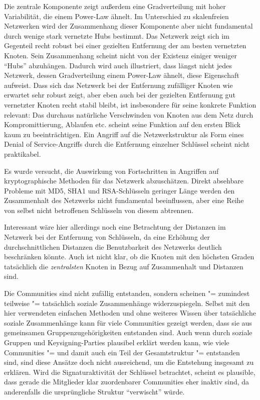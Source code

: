 Die zentrale Komponente zeigt au{\ss}erdem eine Gradverteilung mit
hoher Variabilit\"at, die einem Power-Law \"ahnelt. Im Unterschied zu
skalenfreien Netzwerken wird der Zusammenhang dieser Komponente aber
nicht fundamental durch wenige stark vernetzte Hubs bestimmt. Das
Netzwerk zeigt sich im Gegenteil recht robust bei einer gezielten
Entfernung der am besten vernetzten Knoten. Sein Zusammenhang scheint
nicht von der Existenz einiger weniger "`Hubs"' abzuh\"angen. Dadurch
wird auch illustriert, dass l\"angst nicht jedes Netzwerk, dessen
Gradverteilung einem Power-Law \"ahnelt, diese Eigenschaft aufweist. Dass sich das Netzwerk bei
der Entfernung zuf\"alliger Knoten wie erwartet sehr robust zeigt,
aber eben auch bei der gezielten Entfernung gut vernetzter Knoten
recht stabil bleibt, ist insbesondere f\"ur seine konkrete Funktion
relevant: Das durchaus nat\"urliche Verschwinden von Knoten aus dem
Netz durch Kompromittierung, Ablaufen etc. scheint seine Funktion auf
den ersten Blick kaum zu beeintr\"achtigen. Ein Angriff auf die
Netzwerkstruktur als Form eines Denial of Service-Angriffs durch die
Entfernung einzelner Schl\"ussel scheint nicht praktikabel.

Es wurde versucht, die Auswirkung von Fortschritten in Angriffen auf
kryptographische Methoden für das Netzwerk abzuschätzen. Direkt
absehbare Probleme mit MD5, SHA1 und RSA-Schlüsseln geringer Länge
werden den Zusammenhalt des Netzwerks nicht fundamental beeinflussen,
aber eine Reihe von selbst nicht betroffenen Schlüsseln von diesem
abtrennen.

Interessant w\"are hier allerdings noch eine Betrachtung der Distanzen
im Netzwerk bei der Entfernung von Schl\"usseln, da eine Erh\"ohung
der durchschnittlichen Distanzen die Benutzbarkeit des Netzwerks
deutlich beschr\"anken k\"onnte. Auch ist nicht klar, ob die Knoten
mit den h\"ochsten Graden tats\"achlich die \emph{zentralsten} Knoten
in Bezug auf Zusammenhalt und Distanzen sind.

Die Communities sind nicht zufällig entstanden, sondern scheinen
"= zumindest teilweise "= tatsächlich soziale Zusammenhänge
widerzuspiegeln. Selbst mit den hier verwendeten einfachen Methoden
und ohne weiteres Wissen über tatsächliche soziale Zusammenhänge
kann für viele Communities gezeigt werden, dass sie aus gemeinsamen
Gruppenzugehörigkeiten entstanden sind. Auch wenn durch soziale
Gruppen und Keysigning-Parties plausibel erkl\"art werden kann, wie
viele Communities "= und damit auch ein Teil der Gesamtstruktur "=
entstanden sind, sind diese Ans\"atze doch nicht ausreichend, um die
Entstehung insgesamt zu erkl\"aren. Wird die Signaturaktivit\"at der
Schl\"ussel betrachtet, scheint es plausible, dass gerade die
Mitglieder klar zuordenbarer Communities eher inaktiv sind, da
anderenfalls die urspr\"ungliche Struktur "`verwischt"' w\"urde.

